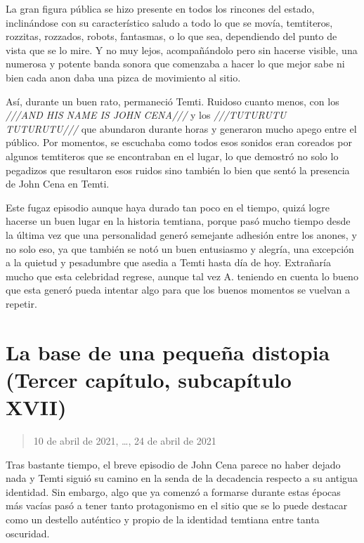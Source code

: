 \documentclass[
  spanish,
]{book}
\begin{document}
La gran figura pública se hizo presente en todos los rincones del estado, inclinándose con su característico saludo a todo lo que se movía, temtiteros, rozzitas, rozzados, robots, fantasmas, o lo que sea, dependiendo del punto de vista que se lo mire. Y no muy lejos, acompañándolo pero sin hacerse visible, una numerosa y potente banda sonora que comenzaba a hacer lo que mejor sabe ni bien cada anon daba una pizca de movimiento al sitio.

Así, durante un buen rato, permaneció Temti. Ruidoso cuanto menos, con los \emph{///AND HIS NAME IS JOHN CENA///} y los \emph{///TUTURUTU TUTURUTU///} que abundaron durante horas y generaron mucho apego entre el público. Por momentos, se escuchaba como todos esos sonidos eran coreados por algunos temtiteros que se encontraban en el lugar, lo que demostró no solo lo pegadizos que resultaron esos ruidos sino también lo bien que sentó la presencia de John Cena en Temti.

Este fugaz episodio aunque haya durado tan poco en el tiempo, quizá logre hacerse un buen lugar en la historia temtiana, porque pasó mucho tiempo desde la última vez que una personalidad generó semejante adhesión entre los anones, y no solo eso, ya que también se notó un buen entusiasmo y alegría, una excepción a la quietud y pesadumbre que asedia a Temti hasta día de hoy. Extrañaría mucho que esta celebridad regrese, aunque tal vez A. teniendo en cuenta lo bueno que esta generó pueda intentar algo para que los buenos momentos se vuelvan a repetir.

\hypertarget{la-base-de-una-pequeuxf1a-distopia-tercer-capuxedtulo-subcapuxedtulo-xvii}{%
\section{La base de una pequeña distopia (Tercer capítulo, subcapítulo XVII)}\label{la-base-de-una-pequeuxf1a-distopia-tercer-capuxedtulo-subcapuxedtulo-xvii}}

\begin{quote}
10 de abril de 2021, \ldots, 24 de abril de 2021
\end{quote}

Tras bastante tiempo, el breve episodio de John Cena parece no haber dejado nada y Temti siguió su camino en la senda de la decadencia respecto a su antigua identidad. Sin embargo, algo que ya comenzó a formarse durante estas épocas más vacías pasó a tener tanto protagonismo en el sitio que se lo puede destacar como un destello auténtico y propio de la identidad temtiana entre tanta oscuridad.
\end{document}
